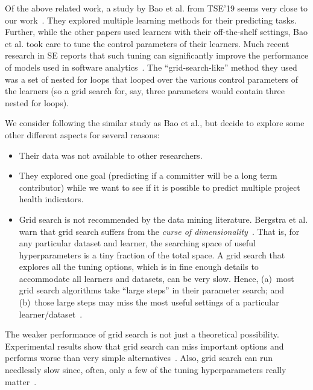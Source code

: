 \documentclass[sigconf,anonymous,review]{acmart}
\newcommand{\bi}{\begin{itemize}}
\newcommand{\ei}{\end{itemize}}
\begin{document}
Of the above related work, a study by 
Bao et al. from TSE'19 seems very close to our work~\cite{bao2019large}. 
They explored multiple learning methods for their predicting tasks.
Further, while the other papers used learners with their off-the-shelf settings, Bao et al. took care to tune the control
parameters of their learners.
Much recent research in SE reports that such tuning can significantly improve the performance of models used in software analytics~\cite{Tantithamthavorn16,fu2016differential,Fu2016TuningFS,agrawal2018betterdata,agrawal2019dodge,agrawal2018better}. The ``grid-search-like'' method they used was a set of nested for loops that looped over the various control parameters of the learners (so a grid search for, say, three parameters would contain three nested for loops). 

We consider following the similar study as Bao et al., but decide to explore some other different aspects for several reasons:


    
    
\bi
\item
Their data was not available to other researchers. 
\item
They explored one goal (predicting if a committer will be a long term contributor) while we want to see if it is possible to predict multiple project health indicators.
\item
Grid search is not recommended by the data mining literature. Bergstra et al. warn that grid search suffers from the \textit{curse of dimensionality}~\cite{bergstra2011algorithms}. That is, for any particular dataset and learner, the searching space of useful hyperparameters is a tiny fraction of the total space. A grid search that explores all the tuning options, which is in fine enough details
to accommodate all learners and datasets, can be very slow.
Hence, (a)~most grid search algorithms take ``large steps'' in their parameter search; and (b)~those large steps may miss the most useful settings
of a particular learner/dataset~\cite{bergstra2011algorithms}.
\ei
The weaker performance of grid search is not just a theoretical possibility. Experimental results show that  grid search can   miss important options and performs worse than very simple alternatives~\cite{fu2016differential}. Also, grid search can run needlessly slow since,
often, only a few of the tuning hyperparameters really matter~\cite{Bergstra:2012}. 
\end{document}
